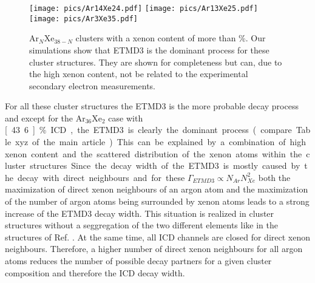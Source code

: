 \begin{figure}
 \centering
 \texttt{[image: pics/Ar14Xe24.pdf]}
 \texttt{[image: pics/Ar13Xe25.pdf]}
 \texttt{[image: pics/Ar3Xe35.pdf]}
 \caption{Ar$_N$Xe$_{38-N}$ clusters with a xenon content of more
          than \unit[50]{\%}.
          Our simulations show that ETMD3 is the dominant process
          for these cluster structures.
          They are shown for completeness but can, due to the high xenon content,
          not be related to the experimental secondary electron measurements.}
 \label{figure:ArXe_gt50}
\end{figure}


For all these cluster structures the ETMD3 is the more probable decay process and
except for the Ar$_{36}$Xe$_2$ case with \unit[43.6]{\%} ICD, the ETMD3 is clearly
the dominant process (compare Table xyz of the main article).
This can be explained by a combination of high xenon content and the
scattered distribution of the xenon atoms within the cluster structures.
Since the decay width of the ETMD3 is mostly caused by the decay
with direct neighbours and for these $\Gamma_{ETMD3} \propto N_{Ar} N_{Xe}^2$
both the maximization of direct xenon neighbours of an argon atom and the
maximization of the number of argon atoms being surrounded by xenon atoms
leads to a strong increase of the ETMD3 decay width. This situation is realized
in cluster structures without a seggregation of the two different elements like
in the structures of Ref. \cite{}. At the same time, all ICD channels are closed
for direct xenon neighbours. Therefore, a higher number of direct xenon neighbours
for all argon atoms reduces the number of possible decay partners for a given
cluster composition and therefore the ICD decay width.



%

